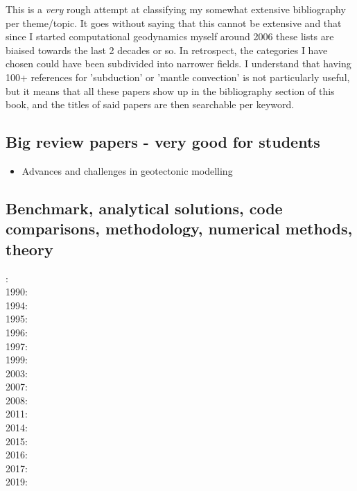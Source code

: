 This is a {\it very} rough attempt at classifying my somewhat extensive 
bibliography per theme/topic.
It goes without saying that this cannot be extensive and that since I 
started computational geodynamics myself around 2006 these lists are 
biaised towards the last 2 decades or so. 
In retrospect, the categories I have chosen could have been subdivided
into narrower fields. I understand that having 100+ references 
for 'subduction'  or 'mantle convection' is not particularly useful, 
but it means that all these papers show up in the bibliography section 
of this book, and the titles of said papers are then searchable per keyword.

\subsection*{Big review papers - very good for students}

\begin{itemize}
\item Advances and challenges in geotectonic modelling \cite{bufy14}
\end{itemize}


\subsection*{Benchmark, analytical solutions, code comparisons, methodology, numerical methods, theory}

: \cite{yusa84}\\
1990: \cite{trab90}\\
1994: \cite{brsa94}\\
1995: \cite{brsa95}\\
1996: \cite{zhon96}\\
1997: \cite{rist97}\\
1999: \cite{lind99}\\
2003: \cite{taki03}\\
2007: \cite{toma07}\\
2008: \cite{zhmt08}\cite{deka08}\cite{trub08}\\
2011: \cite{dumg11}\cite{uibb11}\\
2014: \cite{thmk14}\\
2015: \cite{lelk15}\cite{rumi15}\\
2016: \cite{dumy16}\\
2017: \cite{robh17}\cite{wisv17}\\
2019: \cite{clhe19}

